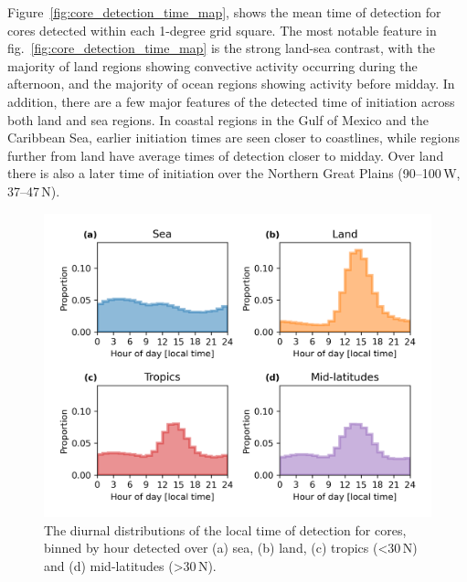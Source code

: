 Figure~\ref{fig:core_detection_time_map}, shows the mean time of detection for cores detected within each 1-degree grid square.
The most notable feature in fig.~\ref{fig:core_detection_time_map} is the strong land-sea contrast, with the majority of land regions showing convective activity occurring during the afternoon, and the majority of ocean regions showing activity before midday.
In addition, there are a few major features of the detected time of initiation across both land and sea regions.
In coastal regions in the Gulf of Mexico and the Caribbean Sea, earlier initiation times are seen closer to coastlines, while regions further from land have average times of detection closer to midday.
Over land there is also a later time of initiation over the Northern Great Plains (90--100\,\textdegree W, 37--47\,\textdegree N).



\begin{figure}[tp]
    \centering
    \includegraphics[width=\textwidth]{figures/chapter2_12.png}
    \caption[
    The diurnal distributions of the local time of detection for cores detected over land, sea, tropics and mid-latitudes
    ]{
    The diurnal distributions of the local time of detection for cores, binned by hour detected over (a) sea, (b) land, (c) tropics (\textless 30\,\textdegree N) and (d) mid-latitudes (\textgreater 30\,\textdegree N).
    }
    \label{fig:core_diurnal_land_sea}
\end{figure}


